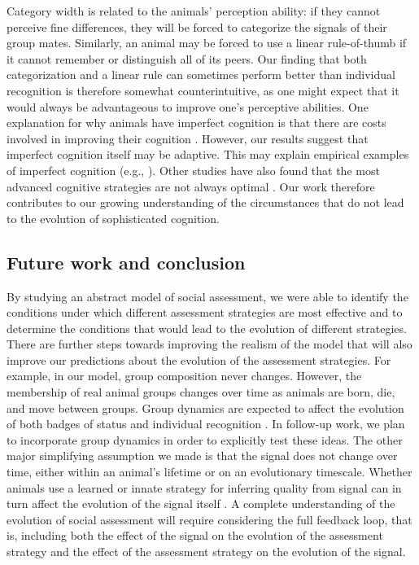 Category width is related to the animals' perception ability: if they cannot perceive fine differences, they will be forced to categorize the signals of their group mates. Similarly, an animal may be forced to use a linear rule-of-thumb if it cannot remember or distinguish all of its peers. Our finding that both categorization and a linear rule can sometimes perform better than individual recognition is therefore somewhat counterintuitive, as one might expect that it would always be advantageous to improve one's perceptive abilities. One explanation for why animals have imperfect cognition is that there are costs involved in improving their cognition \citep{Dunbar:1992ys,Laughlin:1998ly,Laughlin:2001qf,Gavrilets:2006fk,MacIver:2010ve}. However, our results suggest that imperfect cognition itself may be adaptive. This may explain empirical examples of imperfect cognition (e.g., \citep{Kikuchi:2010ys}). Other studies have also found that the most advanced cognitive strategies are not always optimal \citep{Stephens:1991fk,Kerr:2003vn,Dunlap:2009vn}. Our work therefore contributes to our growing understanding of the circumstances that do not lead to the evolution of sophisticated cognition. 

\subsection*{Future work and conclusion}
 
By studying an abstract model of social assessment, we were able to identify the conditions under which different assessment strategies are most effective and to determine the conditions that would lead to the evolution of different strategies. There are further steps towards improving the realism of the model that will also improve our predictions about the evolution of the assessment strategies. For example, in our model, group composition never changes. However, the membership of real animal groups changes over time as animals are born, die, and move between groups. Group dynamics are expected to affect the evolution of both badges of status \citep{Rohwer:1975fk,Tibbetts:2009kx} and individual recognition \citep{Whitfield:1987tg,Veiga:1993fk}. In follow-up work, we plan to incorporate group dynamics in order to explicitly test these ideas. The other major simplifying assumption we made is that the signal does not change over time, either within an animal's lifetime or on an evolutionary timescale. Whether animals use a learned or innate strategy for inferring quality from signal can in turn affect the evolution of the signal itself \citep{Kamo:2002vi}. A complete understanding of the evolution of social assessment will require considering the full feedback loop, that is, including both the effect of the signal on the evolution of the assessment strategy and the effect of the assessment strategy on the evolution of the signal.


